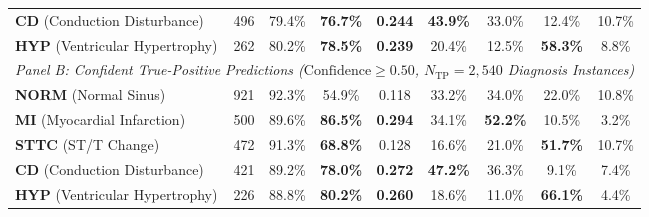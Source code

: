 \documentclass[12pt]{elsarticle}
\begin{document}
\begin{table}[t]
{\begin{tabular}{lcccccccc}
\textbf{CD} (Conduction Disturbance) & 496 & 79.4\% & \textbf{76.7\%} & \textbf{0.244} & \textbf{43.9\%} & 33.0\% & 12.4\% & 10.7\% \\
\textbf{HYP} (Ventricular Hypertrophy) & 262 & 80.2\% & \textbf{78.5\%} & \textbf{0.239} & 20.4\% & 12.5\% & \textbf{58.3\%} & 8.8\% \\
\midrule
\multicolumn{9}{l}{\textit{Panel B: Confident True-Positive Predictions ($\text{Confidence} \ge 0.50$, $N_{\text{TP}} = 2,540$ Diagnosis Instances)}} \\
\midrule
\textbf{NORM} (Normal Sinus) & 921 & 92.3\% & 54.9\% & 0.118 & 33.2\% & 34.0\% & 22.0\% & 10.8\% \\
\textbf{MI} (Myocardial Infarction) & 500 & 89.6\% & \textbf{86.5\%} & \textbf{0.294} & 34.1\% & \textbf{52.2\%} & 10.5\% & 3.2\% \\
\textbf{STTC} (ST/T Change) & 472 & 91.3\% & \textbf{68.8\%} & 0.128 & 16.6\% & 21.0\% & \textbf{51.7\%} & 10.7\% \\
\textbf{CD} (Conduction Disturbance) & 421 & 89.2\% & \textbf{78.0\%} & \textbf{0.272} & \textbf{47.2\%} & 36.3\% & 9.1\% & 7.4\% \\
\textbf{HYP} (Ventricular Hypertrophy) & 226 & 88.8\% & \textbf{80.2\%} & \textbf{0.260} & 18.6\% & 11.0\% & \textbf{66.1\%} & 4.4\% \\
\bottomrule
\end{tabular}%
}
\end{table}
\end{document}
